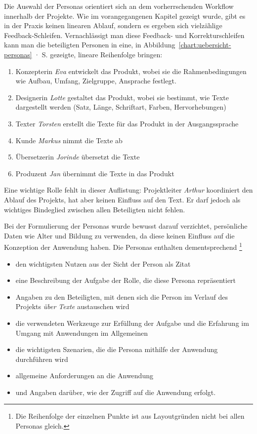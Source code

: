 Die Auswahl der Personas orientiert sich an dem vorherrschenden Workflow innerhalb der Projekte. Wie im vorangegangenen Kapitel gezeigt wurde, gibt es in der Praxis keinen linearen Ablauf, sondern es ergeben sich vielzählige Feedback-Schleifen. Vernachlässigt man diese Feedback- und Korrekturschleifen kann man die beteiligten Personen in eine, in Abbildung~\ref{chart:uebersicht-personas} · S.\pageref{chart:uebersicht-personas} gezeigte, lineare Reihenfolge bringen:
\begin{samepage}\begin{enumerate}\itemsep -5pt
\item Konzepterin \emph{Eva} entwickelt das Produkt, wobei sie die Rahmenbedingungen wie Aufbau, Umfang, Zielgruppe, Ansprache festlegt. 
\item Designerin \emph{Lotte} gestaltet das Produkt, wobei sie bestimmt, wie Texte dargestellt werden (Satz, Länge, Schriftart, Farben, Hervorhebungen)
\item Texter \emph{Torsten} erstellt die Texte für das Produkt in der Ausgangssprache
\item Kunde \emph{Markus} nimmt die Texte ab
\item Übersetzerin \emph{Jorinde} übersetzt die Texte
\item Produzent \emph{Jan} übernimmt die Texte in das Produkt
\end{enumerate}\end{samepage}

Eine wichtige Rolle fehlt in dieser Auflistung: Projektleiter \emph{Arthur} koordiniert den Ablauf des Projekts, hat aber keinen Einfluss auf den Text. Er darf jedoch als wichtiges Bindeglied zwischen allen Beteiligten nicht fehlen.

Bei der Formulierung der Personas wurde bewusst darauf verzichtet, persönliche Daten wie Alter und Bildung zu verwenden, da diese keinen Einfluss auf die Konzeption der Anwendung haben. Die Personas enthalten dementsprechend \footnote{Die Reihenfolge der einzelnen Punkte ist aus Layoutgründen nicht bei allen Personas gleich.}
\begin{itemize}\itemsep -5pt
\item den wichtigsten Nutzen aus der Sicht der Person als Zitat
\item eine Beschreibung der Aufgabe der Rolle, die diese Persona repräsentiert
\item Angaben zu den Beteiligten, mit denen sich die Person im Verlauf des Projekts \emph{über Texte} austauschen wird
\item die verwendeten Werkzeuge zur Erfüllung der Aufgabe und die Erfahrung im Umgang mit Anwendungen im Allgemeinen
\item die wichtigsten Szenarien, die die Persona mithilfe der Anwendung durchführen wird
\item allgemeine Anforderungen an die Anwendung
\item und Angaben darüber, wie der Zugriff auf die Anwendung erfolgt.
\end{itemize}

